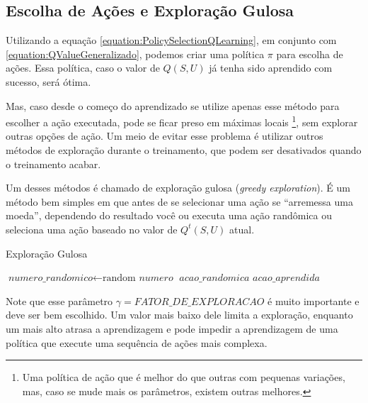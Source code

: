 \subsection{Escolha de Ações e Exploração Gulosa} \label{subsection:EscolhaDeAçõesExploraçãoGulosa}

Utilizando a equação \ref{equation:PolicySelectionQLearning}, em conjunto com \ref{equation:QValueGeneralizado}, podemos criar uma política $ \pi $ para escolha de ações. Essa política, caso o valor de $ Q \left( S, U \right) $ já tenha sido aprendido com sucesso, será ótima.

Mas, caso desde o começo do aprendizado se utilize apenas esse método para escolher a ação executada, pode se ficar preso em máximas locais%
\footnote{Uma política de ação que é melhor do que outras com pequenas variações, mas, caso se mude mais os parâmetros, existem outras melhores.%
}, sem explorar outras opções de ação. Um meio de evitar esse problema é utilizar outros métodos de exploração durante o treinamento, que podem ser desativados quando o treinamento acabar. 

Um desses métodos é chamado de exploração gulosa (\textit{greedy exploration}). É um método bem simples em que antes de se selecionar uma ação se ``arremessa uma moeda'', dependendo do resultado você ou executa uma ação randômica ou seleciona uma ação baseado no valor de $ Q^t \left( S, U \right) $ atual.

\begin{algorithm}[H]
	\caption{Exploração Gulosa} \label{euclid}
	\begin{algorithmic}[1]
			\State $\textit{numero\_randomico} \gets \text{random }\textit{numero}$
				\State \Return $\textit{acao\_randomica}$
			\Else
				\State \Return $\textit{acao\_aprendida}$
			\EndIf
		\EndProcedure
	\end{algorithmic}
\end{algorithm}

Note que esse parâmetro $ \gamma = \textit{FATOR\_DE\_EXPLORACAO} $ é muito importante e deve ser bem escolhido. Um valor mais baixo dele limita a exploração, enquanto um mais alto atrasa a aprendizagem e pode impedir a aprendizagem de uma política que execute uma sequência de ações mais complexa.
